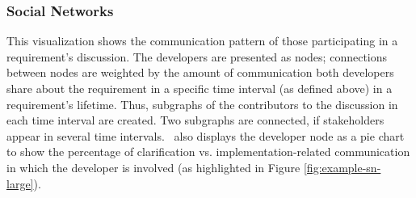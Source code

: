 \subsubsection{Social Networks} 
This visualization shows the communication pattern of those participating in a requirement's discussion. 
The developers are presented as nodes; connections between nodes are weighted by the amount of communication both developers share about the requirement in a specific time interval (as defined above) in a requirement's lifetime. 
Thus, subgraphs of the contributors to the discussion in each time interval are created.
Two subgraphs are connected, if  stakeholders appear in several time intervals. 
\viss\ also displays the developer node as a pie chart to show the percentage of clarification vs. implementation-related communication in which the developer is involved (as highlighted in Figure \ref{fig:example-sn-large}).





